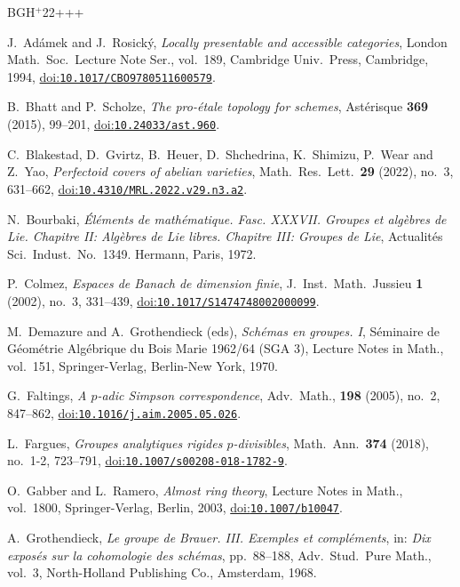 \documentclass[10pt,a4paper]{article}
\newcommand{\doi}[1]{\href{https://doi.org/#1}{doi:\nolinkurl{#1}}}
\theoremstyle{definition}
\theoremstyle{remark}
\numberwithin{equation}{section}
\begin{document}
\newcommand{\etalchar}[1]{$^{#1}$}
\begin{thebibliography}{BGH{\etalchar{+}}22+++}
	
J.~Ad\'{a}mek and  J.~Rosick\'{y}, 
{\em Locally presentable and accessible categories}, London Math.\ Soc.\ Lecture Note Ser., vol.~189, Cambridge Univ.\ Press, Cambridge, 1994, \doi{10.1017/CBO9780511600579}.

B.~Bhatt and  P.~Scholze, 
{\em {T}he pro-\'{e}tale topology for schemes}, Ast\'{e}risque \textbf{369} (2015), 99--201, \doi{10.24033/ast.960}.
        
\bibitem[BGH{\etalchar{+}}22]{perfectoid-covers-Arizona}
C.~Blakestad, D.~Gvirtz, B.~Heuer, D.~Shchedrina, K.~Shimizu, P.~Wear and  Z.~Yao, 
{\em {P}erfectoid covers of abelian varieties}, Math.\ Res.\ Lett.\ \textbf{29} (2022), no.~3, 
631--662,  \doi{10.4310/MRL.2022.v29.n3.a2}.
	
N.~Bourbaki, 
{\em \'{E}l\'{e}ments de math\'{e}matique. {F}asc. {XXXVII}.  {G}roupes et alg\`ebres de {L}ie. {C}hapitre {II}: {A}lg\`ebres de {L}ie libres. {C}hapitre {III}: {G}roupes de {L}ie}, Actualit\'{e}s Sci.\ Indust.\, No.~1349. Hermann, Paris, 1972.
	

P.~Colmez, 
{\em {E}spaces de {B}anach de dimension finie}, J.~Inst.\ Math.\ Jussieu \textbf{1} (2002), no.~3, 331--439, \doi{10.1017/S1474748002000099}.

M.~Demazure and A.~Grothendieck (eds), \emph{Sch\'emas en groupes. I}, S\'eminaire de G\'eom\'etrie Alg\'ebrique du Bois Marie 1962/64 (SGA 3), Lecture Notes in Math., vol.~151, Springer-Verlag, Berlin-New York, 1970.

G.~Faltings, 
{\em {A} {$p$}-adic {S}impson correspondence}, Adv.\ Math., \textbf{198} (2005), no.~2, 847--862, \doi{10.1016/j.aim.2005.05.026}.
	
L.~Fargues, 
{\em {G}roupes analytiques rigides {$p$}-divisibles}, Math.\ Ann.\ \textbf{374} (2018), no.~1-2, 723--791, \doi{10.1007/s00208-018-1782-9}.
	
O.~Gabber and L.~Ramero, 
{\em {A}lmost ring theory},  Lecture Notes in Math., vol.~1800, Springer-Verlag, Berlin, 2003, \doi{10.1007/b10047}.
	
A.~Grothendieck, 
{\em Le groupe de {B}rauer. {III}. {E}xemples et compl\'{e}ments}, in: {\em Dix expos\'{e}s sur la cohomologie des sch\'{e}mas}, pp.~88--188, Adv.\ Stud.\ Pure Math., vol.~3, North-Holland Publishing Co., Amsterdam, 1968.


\end{thebibliography}
\end{document}
